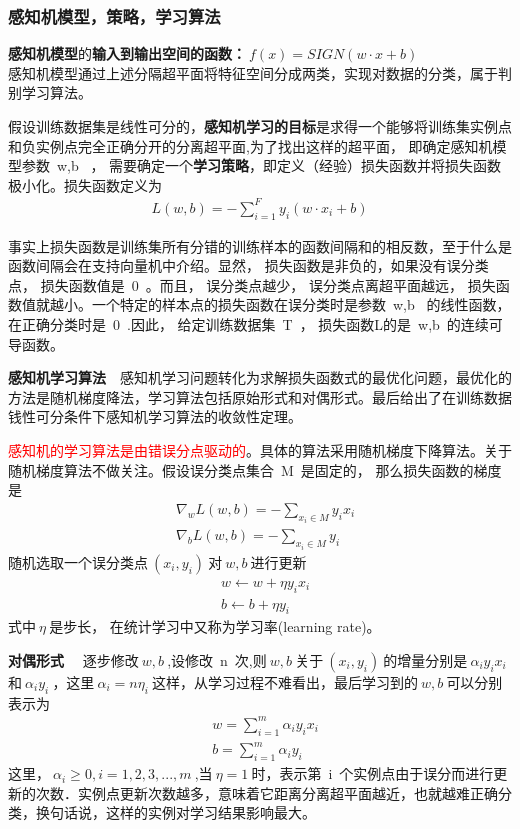 \subsubsection{感知机模型，策略，学习算法}
\textbf{感知机模型}的\textbf{输入到输出空间的函数：}$~f(x) = SIGN(w\cdot x+b)~$\\
感知机模型通过上述分隔超平面将特征空间分成两类，实现对数据的分类，属于判别学习算法。

假设训练数据集是线性可分的，\textbf{感知机学习的目标}是求得一个能够将训练集实例点和负实例点完全正确分开的分离超平面,为了找出这样的超平面， 即确定感知机模型参数~w,b~ ， 需要确定一个\textbf{学习策略}，即定义（经验）损失函数并将损失函数极小化。损失函数定义为
\begin{align}
L(w,b)=-\sum_{i=1}^{F}y_i(w\cdot x_i+b)  \nonumber
\end{align}

事实上损失函数是训练集所有分错的训练样本的函数间隔和的相反数，至于什么是函数间隔会在支持向量机中介绍。显然， 损失函数是非负的，如果没有误分类点， 损失函数值是~0~。而且， 误分类点越少， 误分类点离超平面越远， 损失函数值就越小。一个特定的样本点的损失函数在误分类时是参数~w,b~ 的线性函数， 在正确分类时是~0~.因此， 给定训练数据集~T~， 损失函数L的是~w,b~的连续可导函数。

\textbf{感知机学习算法}~~感知机学习问题转化为求解损失函数式的最优化问题，最优化的方法是随机梯度降法，学习算法包括原始形式和对偶形式。最后给出了在训练数据钱性可分条件下感知机学习算法的收敛性定理。

\textcolor{red}{感知机的学习算法是由错误分点驱动的}。具体的算法采用随机梯度下降算法。关于随机梯度算法不做关注。假设误分类点集合~M~是固定的， 那么损失函数的梯度是
\begin{align}
&\nabla_wL(w,b)=-\sum_{x_i \in M}y_ix_i  \nonumber\\
&\nabla_bL(w,b)=-\sum_{x_i \in M}y_i     \nonumber
\end{align}
随机选取一个误分类点$~(x_i,y_i)~$对$~w,b~$进行更新
\begin{align}
&w\leftarrow    w+\eta y_ix_i  \nonumber\\
&b\leftarrow    b+\eta y_i     \nonumber
\end{align}
式中$~\eta~$是步长， 在统计学习中又称为学习率(learning rate)。

\textbf{对偶形式}~~
逐步修改$~w,b~$,设修改~n~次,则$~w,b~$关于$~(x_i,y_i)~$的增量分别是$~\alpha_iy_ix_i~$和$~\alpha_iy_i~$，这里$~\alpha_i=n\eta_i~$这样，从学习过程不难看出，最后学习到的$~w,b~$可以分别表示为
\begin{align}
&w = \sum_{i=1}^{m}\alpha_iy_ix_i  \nonumber\\
&b = \sum_{i=1}^{m}\alpha_iy_i     \nonumber
\end{align}
这里，$~\alpha_i\geq 0,i=1,2,3,...,m~$,当$~\eta=1~$时，表示第~i~个实例点由于误分而进行更新的次数．实例点更新次数越多，意味着它距离分离超平面越近，也就越难正确分类，换句话说，这样的实例对学习结果影响最大。


